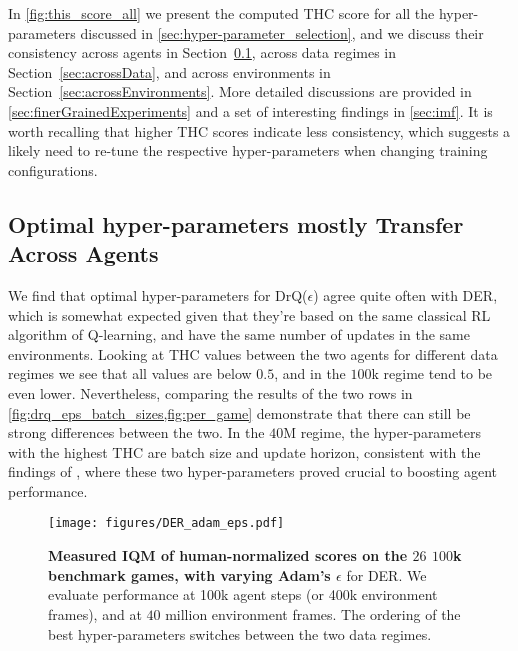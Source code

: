 \documentclass[10pt]{article} %
\begin{document}
In \autoref{fig:this_score_all} we present the computed THC score for all the hyper-parameters discussed in \cref{sec:hyper-parameter_selection}, and we discuss their consistency across agents in Section~\ref{sec:acrossAlgorithms}, across data regimes in Section~\ref{sec:acrossData}, and  across environments in Section~\ref{sec:acrossEnvironments}. More detailed discussions are provided in \autoref{sec:finerGrainedExperiments} and a set of interesting findings in \autoref{sec:imf}. It is worth recalling that higher THC scores indicate less consistency, which suggests a likely need to re-tune the respective hyper-parameters when changing training configurations.


\subsection{Optimal hyper-parameters mostly Transfer Across Agents}
\label{sec:acrossAlgorithms}
We find that optimal hyper-parameters for DrQ($\epsilon$) agree quite often with DER, which is somewhat expected given that they're based on the same classical RL algorithm of Q-learning, and have the same number of updates in the same environments. Looking at THC values between the two agents for different data regimes we see that all values are below $0.5$, and in the $100$k regime tend to be even lower. Nevertheless, comparing the results of the two rows in \cref{fig:drq_eps_batch_sizes,fig:per_game} demonstrate that there can still be strong differences between the two. In the $40$M regime, the hyper-parameters with the highest THC are batch size and update horizon, consistent with the findings of \cite{obandoceron2023small}, where these two hyper-parameters proved crucial to boosting agent performance.


\begin{figure}[!t]
    \centering
  \texttt{[image: figures/DER\_adam\_eps.pdf]}%
    \caption{
     \textbf{Measured IQM of human-normalized scores on the $26$ $100$k benchmark games, with varying Adam's $\epsilon$} for DER. We evaluate performance at 100k agent steps (or 400k environment frames), and at $40$ million environment frames. The ordering of the best hyper-parameters switches between the two data regimes.
    }
    \label{fig:der_adam_eps}
\end{figure}
\end{document}
